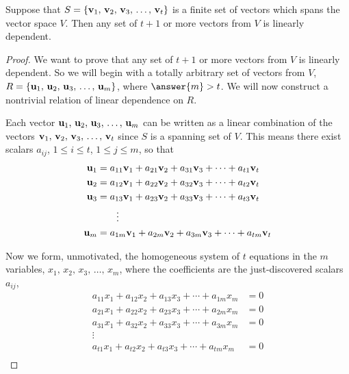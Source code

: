 \documentclass{ximera}
\begin{document}
\begin{theorem}
  \label{theorem:SSLD}

  Suppose that $S=\left\{\mathbf{v}_{1},\,\mathbf{v}_{2},\,\mathbf{v}_{3},\,\ldots,\,\mathbf{v}_{t}\right\}$ is a finite set of vectors
  which spans the vector space $V$.  Then any set of $t+1$ or more
  vectors from $V$ is linearly dependent.

\begin{proof}
  We want to prove that any set of $t+1$ or more vectors from $V$ is
  linearly dependent.  So we will begin with a totally arbitrary set
  of vectors from $V$, $R=\left\{\mathbf{u}_{1},\,\mathbf{u}_{2},\,\mathbf{u}_{3},\,\ldots,\,\mathbf{u}_{m}\right\}$, where
  $\answer{m}>t$.  We will now construct a nontrivial relation of
  linear dependence on $R$.

  Each vector $\mathbf{u}_{1},\,\mathbf{u}_{2},\,\mathbf{u}_{3},\,\ldots,\,\mathbf{u}_{m}$ can be written as a linear
  combination of the vectors $\mathbf{v}_{1},\,\mathbf{v}_{2},\,\mathbf{v}_{3},\,\ldots,\,\mathbf{v}_{t}$ since $S$ is a
  spanning set of $V$.  This means there exist scalars $a_{ij}$,
  $1\leq i\leq t$, $1\leq j\leq m$, so that
  \begin{align*}
    \mathbf{u}_1&=a_{11}\mathbf{v}_1+a_{21}\mathbf{v}_2+a_{31}\mathbf{v}_3+\cdots+a_{t1}\mathbf{v}_t\\
    \mathbf{u}_2&=a_{12}\mathbf{v}_1+a_{22}\mathbf{v}_2+a_{32}\mathbf{v}_3+\cdots+a_{t2}\mathbf{v}_t\\
    \mathbf{u}_3&=a_{13}\mathbf{v}_1+a_{23}\mathbf{v}_2+a_{33}\mathbf{v}_3+\cdots+a_{t3}\mathbf{v}_t\\
              &\quad\quad\vdots\\
    \mathbf{u}_m&=a_{1m}\mathbf{v}_1+a_{2m}\mathbf{v}_2+a_{3m}\mathbf{v}_3+\cdots+a_{tm}\mathbf{v}_t
  \end{align*}

  Now we form, unmotivated, the homogeneous system of $t$ equations in
  the $m$ variables, $x_1,\,x_2,\,x_3,\,\ldots,\,x_m$, where the
  coefficients are the just-discovered scalars $a_{ij}$,
  \begin{align*}
    a_{11}x_1+a_{12}x_2+a_{13}x_3+\cdots+a_{1m}x_m&=0\\
    a_{21}x_1+a_{22}x_2+a_{23}x_3+\cdots+a_{2m}x_m&=0\\
    a_{31}x_1+a_{32}x_2+a_{33}x_3+\cdots+a_{3m}x_m&=0\\
    \vdots\quad\quad&\\
    a_{t1}x_1+a_{t2}x_2+a_{t3}x_3+\cdots+a_{tm}x_m&=0\\
  \end{align*}


\end{proof}
\end{theorem}
\end{document}
